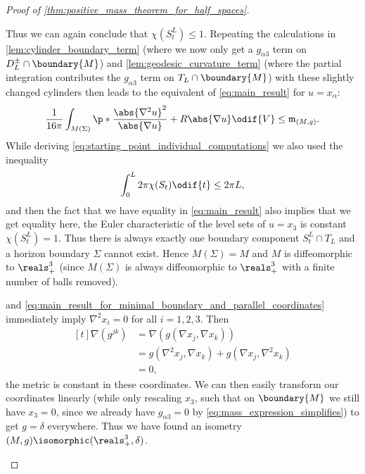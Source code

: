 \documentclass[titlepage,numbers=noenddot,oneside,%
cleardoublepage=empty,paper=a4,fontsize=11pt,%
english,%
]{scrartcl}
\newcommand{\mass}[2]{\mathfrak{m}_{(#1,#2)}} %
\begin{document}
\begin{proof}[Proof of \cref{thm:positive_mass_theorem_for_half_spaces}]
\begin{proofdescription}
        Thus we can again conclude that \( \chi(S_t^L)\leq 1 \). Repeating the calculations in \cref{lem:cylinder_boundary_term} (where we now only get a \( g_{\alpha 3} \) term on \( D_L^{\pm}\cap \boundary{M} \)) and \cref{lem:geodesic_curvature_term} (where the partial integration contributes the \( g_{\alpha 3} \) term on \( T_L\cap \boundary{M} \)) with these slightly changed cylinders then leads to the equivalent of \cref{eq:main_result} for \( u=x_\alpha \):
        \begin{equation}
            \label{eq:main_result_for_minimal_boundary_and_parallel_coordinates}
            \frac{1}{16\pi}\int_{M(\Sigma)}\p*{\frac{\abs{\nabla^2 u}^2}{\abs{\nabla u}}+R\abs{\nabla u}}\odif{V}\leq \mass{M}{g}.
        \end{equation}
        While deriving \cref{eq:starting_point_individual_computations} we also used the inequality
        \begin{equation*}
            \int_{0}^{L}2\pi \chi(S_t)\odif{t}\leq 2\pi L,
        \end{equation*}
        and then the fact that we have equality in \cref{eq:main_result} also implies that we get equality here, \ie the Euler characteristic of the level sets of \( u=x_3 \) is constant \( \chi(S_t^L)=1 \). Thus there is always exactly one boundary component \( S_t^L\cap T_L \) and a horizon boundary \( \Sigma \) cannot exist. Hence \( M(\Sigma)=M \) and \( M \) is diffeomorphic to \( \reals^3_+ \) (since \( M(\Sigma) \) is always diffeomorphic to \( \reals^3_+ \) with a finite number of balls removed). 

         and \cref{eq:main_result_for_minimal_boundary_and_parallel_coordinates} immediately imply \( \nabla^2 x_i=0 \) for all \( i=1,2,3 \). Then
        \begin{equation*}
            \begin{aligned}[t]
                \nabla (g^{jk})&=\nabla(g(\nabla x_j,\nabla x_k))\\
                &=g(\nabla^2 x_j,\nabla x_k)+g(\nabla x_j,\nabla^2 x_k)\\
                &=0,
            \end{aligned}
        \end{equation*}
        \ie the metric is constant in these coordinates. We can then easily transform our coordinates linearly (while only rescaling \( x_3 \), such that on \( \boundary{M} \) we still have \( x_3=0 \), since we already have \( g_{\alpha 3}=0 \) by \cref{eq:mass_expression_simplifies}) to get \( g=\delta \) everywhere. Thus we have found an isometry \( (M,g)\isomorphic (\reals^3_+,\delta) \).
    \end{proofdescription}
\end{proof}
\end{document}

